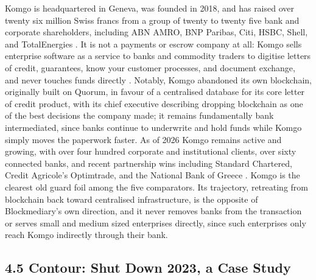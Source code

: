 \documentclass[12pt, a4paper]{article}
\begin{document}
Komgo is headquartered in Geneva, was founded in 2018, and has raised over twenty six
million Swiss francs from a group of twenty to twenty five bank and corporate
shareholders, including ABN AMRO, BNP Paribas, Citi, HSBC, Shell, and TotalEnergies
\citep{komgoabout}. It is not a payments or escrow company at all: Komgo sells enterprise
software as a service to banks and commodity traders to digitise letters of credit,
guarantees, know your customer processes, and document exchange, and never touches funds
directly \citep{komgoconsensys}. Notably, Komgo abandoned its own blockchain, originally
built on Quorum, in favour of a centralised database for its core letter of credit
product, with its chief executive describing dropping blockchain as one of the best
decisions the company made; it remains fundamentally bank intermediated, since banks
continue to underwrite and hold funds while Komgo simply moves the paperwork faster. As of
2026 Komgo remains active and growing, with over four hundred corporate and institutional
clients, over sixty connected banks, and recent partnership wins including Standard
Chartered, Credit Agricole's Optimtrade, and the National Bank of Greece
\citep{komgonewsroom2025}. Komgo is the clearest old guard foil among the five comparators.
Its trajectory, retreating from blockchain back toward centralised infrastructure, is the
opposite of Blockmediary's own direction, and it never removes banks from the transaction
or serves small and medium sized enterprises directly, since such enterprises only reach
Komgo indirectly through their bank.

\subsection*{4.5 Contour: Shut Down 2023, a Case Study}
\end{document}

